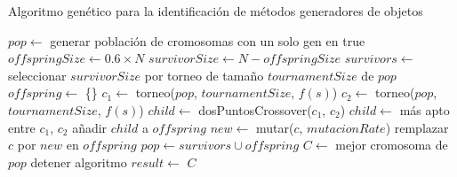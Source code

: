 \begin{algorithm}
  \caption{Algoritmo genético para la identificación de métodos generadores de
  objetos}
  \label{alg:enfoqueGA}
  \begin{algorithmic}[1]
  \STATE $pop \gets$ generar población de cromosomas con un solo gen en true
  \STATE $offspringSize \gets 0.6 \times N$
  \STATE $survivorSize \gets N - offspringSize$
      \STATE $survivors \gets$ seleccionar $survivorSize$ por torneo de tamaño $tournamentSize$ de $pop$
      \STATE $offspring \gets$ \{\}
          \STATE $c_1 \gets$ torneo($pop$, $tournamentSize$, $f(s)$)
          \STATE $c_2 \gets$ torneo($pop$, $tournamentSize$, $f(s)$)
            \STATE $child \gets$ dosPuntosCrossover($c_1$, $c_2$)
          \ELSE
            \STATE $child \gets$ más apto entre $c_1$, $c_2$
          \ENDIF
          \STATE añadir $child$ a $offspring$
      \ENDFOR
          \STATE $new \gets$ mutar($c$, $mutacionRate$)
            \STATE remplazar $c$ por $new$ en $offspring$
          \ENDIF
      \ENDFOR
    \STATE $pop \gets survivors \cup offspring$
    \STATE $C \gets$ mejor cromosoma de $pop$
        \STATE detener algoritmo
    \ENDIF
  \ENDFOR
\STATE $result \gets$ $C$


\end{algorithmic}
\end{algorithm}


  
  


